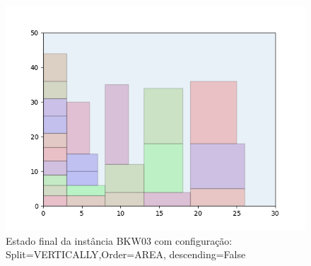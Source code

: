 \begin{figure}[H]
    \centering
    \caption[]{Estado final da instância BKW03 com configuração: Split=VERTICALLY,Order=AREA, descending=False}
    \label{fig:bkw03-vertically-area-false}
    \includegraphics[scale=0.5]{output/figures/bkw/bkw03/vertically/area/false/00}
\end{figure}